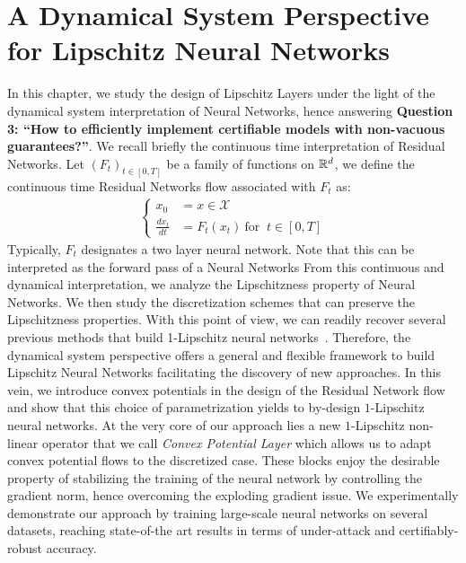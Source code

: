 \chapter{A Dynamical System Perspective for Lipschitz Neural Networks}
\label{chap:dynam}
\minitoc
In this chapter, we study the design of Lipschitz Layers under the light of the dynamical system interpretation of Neural Networks, hence answering \textbf{Question 3: ``How to efficiently implement certifiable models with non-vacuous guarantees?''}. We recall briefly the continuous time interpretation of Residual Networks.
Let $(F_{t})_{t\in[0,T]}$ be a family of functions on $\mathbb{R}^d$, we define the continuous time Residual Networks flow associated with $F_t$ as:
\begin{align*}
  \left\{
    \begin{array}{ll}
    x_0 &= x\in\mathcal{X}\\
    \frac{dx_{t}}{dt} &= F_{{t}}(x_{t}) \  \text{for } \ t\in[0, T]
  \end{array}
  \right.
\end{align*}
Typically, $ F_{{t}}$ designates a two layer neural network. Note that this can be interpreted as the forward pass of a Neural Networks
From this continuous and dynamical interpretation, we  analyze the Lipschitzness property of Neural Networks. We then study the discretization schemes that can preserve the Lipschitzness properties. With this point of view, we can readily recover several previous methods that build 1-Lipschitz neural networks~\citep{trockman2021orthogonalizing,skew2021sahil}.
Therefore, the dynamical system perspective offers a general and flexible framework to build Lipschitz Neural Networks facilitating the discovery of new approaches.
In this vein, we introduce convex potentials in the design of the Residual Network flow and show that this choice of parametrization yields to by-design $1$-Lipschitz neural networks.
At the very core of our approach lies a new $1$-Lipschitz non-linear operator that we call {\em Convex Potential Layer} which allows us to adapt convex potential flows to the discretized case. 
These blocks enjoy the desirable property of stabilizing the training of the neural network by controlling the gradient norm, hence overcoming the exploding gradient issue.
We experimentally demonstrate our approach by training large-scale neural networks on several datasets, reaching state-of-the art results in terms of under-attack and certifiably-robust accuracy.

